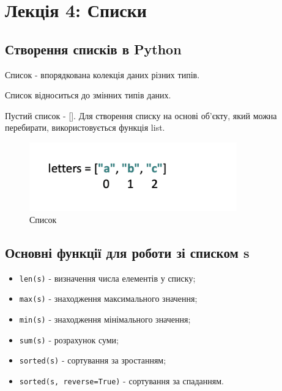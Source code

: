 \section{Лекція 4: Списки}
\subsection{Створення списків в Python} 
\begin{frame}
Список - впорядкована колекція даних різних типів.

Список відноситься до змінних типів даних.

Пустий список - []. Для створення списку на основі об'єкту, який можна перебирати, використовується функція list.
\begin{figure}
\begin{center}
 \includegraphics[width=0.8\textwidth]{pictures/list.png}
\caption{Список}
\label{list} 
\end{center}
\end{figure}

\end{frame}

\subsection{Основні  функції для роботи зі списком s} 
\begin{frame}
    \begin{itemize}
        \item<1-> \texttt{len(s)} - визначення числа елементів у списку;
        \item<2-> \texttt{max(s)} - знаходження максимального значення;
        \item<2-> \texttt{min(s)} - знаходження мінімального значення;
        \item<3-> \texttt{sum(s)} - розрахунок суми;
        \item<4-> \texttt{sorted(s)} - сортування за зростанням;
        \item<4-> \texttt{sorted(s, reverse=True)} - сортування за спаданням.
    \end{itemize}
\end{frame}

